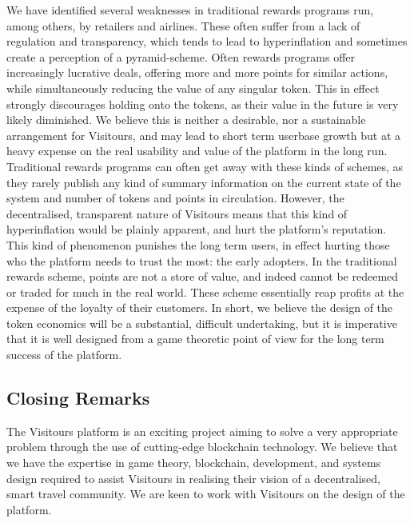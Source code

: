 \documentclass[fontsize=12pt,a4paper]{article}
\begin{document}
We have identified several weaknesses in traditional rewards programs run, among others, by retailers and airlines. These often suffer from a lack of regulation and transparency, which tends to lead to hyperinflation and sometimes create a perception of a pyramid-scheme. Often rewards programs offer increasingly lucrative deals, offering more and more points for similar actions, while simultaneously reducing the value of any singular token. This in effect strongly discourages holding onto the tokens, as their value in the future is very likely diminished. We believe this is neither a desirable, nor a sustainable arrangement for Visitours, and may lead to short term userbase growth but at a heavy expense on the real usability and value of the platform in the long run. Traditional rewards programs can often get away with these kinds of schemes, as they rarely publish any kind of summary information on the current state of the system and number of tokens and points in circulation. However, the decentralised, transparent nature of Visitours means that this kind of hyperinflation would be plainly apparent, and hurt the platform's reputation. This kind of phenomenon punishes the long term users, in effect hurting those who the platform needs to trust the most: the early adopters. In the traditional rewards scheme, points are not a store of value, and indeed cannot be redeemed or traded for much in the real world. These scheme essentially reap profits at the expense of the loyalty of their customers. In short, we believe the design of the token economics will be a substantial, difficult undertaking, but it is imperative that it is well designed from a game theoretic point of view for the long term success of the platform.

\subsection*{Closing Remarks}

The Visitours platform is an exciting project aiming to solve a very appropriate problem through the use of cutting-edge blockchain technology. We believe that we have the expertise in game theory, blockchain, development, and systems design required to assist Visitours in realising their vision of a decentralised, smart travel community. We are keen to work with Visitours on the design of the platform.
\end{document}
